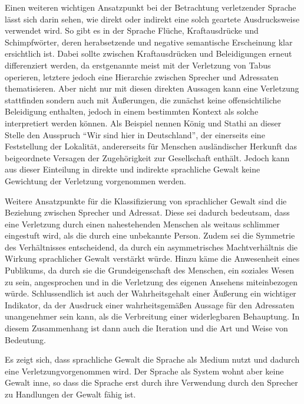 Einen weiteren wichtigen Ansatzpunkt bei der Betrachtung verletzender Sprache lässt sich darin sehen, wie direkt oder indirekt eine solch geartete Ausdrucksweise verwendet wird.
So gibt es in der Sprache Flüche, Kraftausdrücke und Schimpfwörter, deren herabsetzende und negative semantische Erscheinung klar ersichtlich ist.
Dabei sollte zwischen Kraftausdrücken und Beleidigungen erneut differenziert werden, da erstgenannte meist mit der Verletzung von Tabus operieren, letztere jedoch eine Hierarchie zwischen Sprecher und Adressaten thematisieren\cite[S. 53]{EK10}.
Aber nicht nur mit diesen direkten Aussagen kann eine Verletzung stattfinden sondern auch mit Äußerungen, die zunächst keine offensichtiliche Beleidigung enthalten, jedoch in einem bestimmten Kontext als solche interpretiert werden können.
Als Beispiel nennen König und Stathi an dieser Stelle den Ausspruch "`Wir sind hier in Deutschland"', der einerseits eine Feststellung der Lokalität, andererseits für Menschen ausländischer Herkunft das beigeordnete Versagen der Zugehörigkeit zur Gesellschaft enthält.
Jedoch kann aus dieser Einteilung in direkte und indirekte sprachliche Gewalt keine Gewichtung der Verletzung vorgenommen werden.

Weitere Ansatzpunkte für die Klassifizierung von sprachlicher Gewalt sind die Beziehung zwischen Sprecher und Adressat.
Diese sei dadurch bedeutsam, dass eine Verletzung durch einen nahestehenden Menschen als weitaus schlimmer eingestuft wird, als die durch eine unbekannte Person.
Zudem sei die Symmetrie des Verhältnisses entscheidend, da durch ein asymmetrisches Machtverhältnis die Wirkung sprachlicher Gewalt verstärkt würde.
Hinzu käme die Anwesenheit eines Publikums, da durch sie die Grundeigenschaft des Menschen, ein soziales Wesen zu sein, angesprochen und in die Verletzung des eigenen Ansehens miteinbezogen würde\cite[S. 56]{EK10}.
Schlussendlich ist auch der Wahrheitsgehalt einer Äußerung ein wichtiger Indikator, da der Ausdruck einer wahrheitsgemäßen Aussage für den Adressaten unangenehmer sein kann, als die Verbreitung einer widerlegbaren Behauptung.
In diesem Zusammenhang ist dann auch die Iteration und die Art und Weise von Bedeutung\cite[S. 58]{EK10}.

Es zeigt sich, dass sprachliche Gewalt die Sprache als Medium nutzt und dadurch eine Verletzungvorgenommen wird. Der Sprache als System wohnt aber keine Gewalt inne, so dass die Sprache erst durch ihre Verwendung durch den Sprecher zu Handlungen der Gewalt fähig ist.

